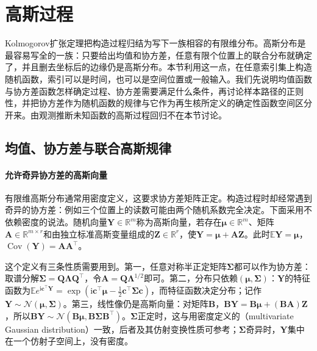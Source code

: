 
\section{高斯过程}
\label{sec:spp-gaussian-processes}

Kolmogorov扩张定理把构造过程归结为写下一族相容的有限维分布。高斯分布是最容易写全的一族：只要给出均值和协方差，任意有限个位置上的联合分布就确定了，并且删去坐标后的边缘仍是高斯分布。本节利用这一点，在任意索引集上构造随机函数，索引可以是时间，也可以是空间位置或一般输入。我们先说明均值函数与协方差函数怎样确定过程、协方差需要满足什么条件，再讨论样本路径的正则性，并把协方差作为随机函数的规律与它作为再生核所定义的确定性函数空间区分开来。由观测推断未知函数的高斯过程回归不在本节讨论。

\subsection{均值、协方差与联合高斯规律}
\label{sec:spp-gp-definition}

\paragraph{允许奇异协方差的高斯向量}
有限维高斯分布通常用密度定义，这要求协方差矩阵正定。构造过程时却经常遇到奇异的协方差：例如三个位置上的读数可能由两个随机系数完全决定。下面采用不依赖密度的说法。随机向量$\bm Y\in\mathbb R^m$称为高斯向量，若存在$\bm\mu\in\mathbb R^m$、矩阵$\bm A\in\mathbb R^{m\times r}$和由独立标准高斯变量组成的$\bm Z\in\mathbb R^r$，使$\bm Y=\bm\mu+\bm A\bm Z$。此时$\mathbb E\bm Y=\bm\mu$，$\operatorname{Cov}(\bm Y)=\bm A\bm A^\top$。

这个定义有三条性质需要用到。第一，任意对称半正定矩阵$\bm\Sigma$都可以作为协方差：取谱分解$\bm\Sigma=\bm Q\bm\Lambda\bm Q^\top$，令$\bm A=\bm Q\bm\Lambda^{1/2}$即可。第二，分布只依赖$(\bm\mu,\bm\Sigma)$：$\bm Y$的特征函数为$\mathbb E e^{\mathrm i\bm c^\top\bm Y}=\exp(\mathrm i\bm c^\top\bm\mu-\tfrac12\bm c^\top\bm\Sigma\bm c)$，而特征函数决定分布；记作$\bm Y\sim\mathcal N(\bm\mu,\bm\Sigma)$。第三，线性像仍是高斯向量：对矩阵$\bm B$，$\bm B\bm Y=\bm B\bm\mu+(\bm B\bm A)\bm Z$，所以$\bm B\bm Y\sim\mathcal N(\bm B\bm\mu,\bm B\bm\Sigma\bm B^\top)$。$\bm\Sigma$正定时，这与用密度定义的（multivariate Gaussian distribution）一致，后者及其仿射变换性质可参考；$\bm\Sigma$奇异时，$\bm Y$集中在一个仿射子空间上，没有密度。

